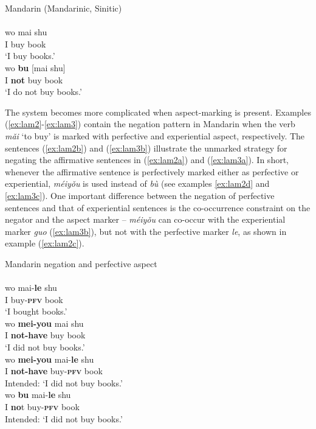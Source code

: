 \documentclass[output=paper]{langscibook}
\begin{document}

\ea Mandarin (Mandarinic, Sinitic) \label{ex:lam1}\\ 
   \label{ex:lam1a}\\
    \gll wo mai	shu \\
         I	buy	book\\
    \glt `I buy books.'
   \label{ex:lam1b}\\
    \gll wo \textbf{bu} [mai shu]\\
    	I \textbf{not} buy book\\
    \glt `I do not buy books.'
\z \z

The system becomes more complicated when aspect-marking is present. Examples (\ref{ex:lam2}-\ref{ex:lam3}) contain the negation pattern in Mandarin when the verb \textit{mǎi} `to buy' is marked with perfective and experiential aspect, respectively. The sentences (\ref{ex:lam2b}) and (\ref{ex:lam3b}) illustrate the unmarked strategy for negating the affirmative sentences in (\ref{ex:lam2a}) and (\ref{ex:lam3a}). In short, whenever the affirmative sentence is perfectively marked either as perfective or experiential, \textit{méiyǒu} is used instead of \textit{bù} (see examples \ref{ex:lam2d} and \ref{ex:lam3c}). One important difference between the negation of perfective sentences and that of experiential sentences is the co-occurrence constraint on the negator and the aspect marker – \textit{méiyǒu} can co-occur with the experiential marker \textit{guo} (\ref{ex:lam3b}), but not with the perfective marker \textit{le}, as shown in example (\ref{ex:lam2c}). 

\ea Mandarin negation and perfective aspect \label{ex:lam2}\\
   \label{ex:lam2a}\\
    \gll wo	mai-\textbf{le} shu \\
    I buy-\textbf{\textsc{pfv}} book\\
    \glt `I bought books.'
   \label{ex:lam2b}\\
    \gll wo	\textbf{mei-you} mai shu \\
    I \textbf{not-have} buy book\\
    \glt `I did not buy books.'
   \label{ex:lam2c}\\
  	\gll *wo	 \textbf{mei-you} mai-\textbf{le} shu\\
  	I \textbf{not-have} buy-\textbf{\textsc{pfv}} book\\
  	\glt Intended: `I did not buy books.'
   \label{ex:lam2d}\\
  	\gll *wo	 \textbf{bu} mai-\textbf{le} shu \\
  	I \textbf{no}t buy-\textbf{\textsc{pfv}} book\\
  	\glt Intended: `I did not buy books.'
\z \z
\end{document}
